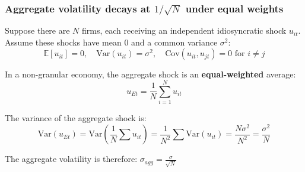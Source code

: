 \documentclass[aspectratio=169,11pt]{beamer}
\begin{document}
\begin{frame}[shrink,label=app_sqrtn]
    \frametitle{Aggregate volatility decays at $1/\sqrt{N}$ under equal weights}

    \vspace{0.4cm}
    Suppose there are $N$ firms, each receiving an independent idiosyncratic shock $u_{it}$.
    Assume these shocks have mean 0 and a common variance $\sigma^2$:
    \begin{equation*}
        \mathbb{E}[u_{it}] = 0, \quad \text{Var}(u_{it}) = \sigma^2, \quad \text{Cov}(u_{it}, u_{jt}) = 0 \text{ for } i \neq j
    \end{equation*}

    \vspace{0.4cm}
    In a non-granular economy, the aggregate shock is an \textbf{equal-weighted} average:
    \begin{equation*}
        u_{Et} = \frac{1}{N} \sum_{i=1}^N u_{it}
    \end{equation*}

    \vspace{0.4cm}
    The variance of the aggregate shock is:
    \begin{equation*}
        \text{Var}(u_{Et}) = \text{Var}\left( \frac{1}{N} \sum u_{it} \right) = \frac{1}{N^2} \sum \text{Var}(u_{it}) = \frac{N \sigma^2}{N^2} =
        \frac{\sigma^2}{N}
    \end{equation*}

    {
    The aggregate volatility is therefore: { $\sigma_{agg} = \frac{\sigma}{\sqrt{N}}$}
    }

    \vspace{0.1cm}
    \hfill \hyperlink{src_sqrtn}{}
\end{frame}
\end{document}
